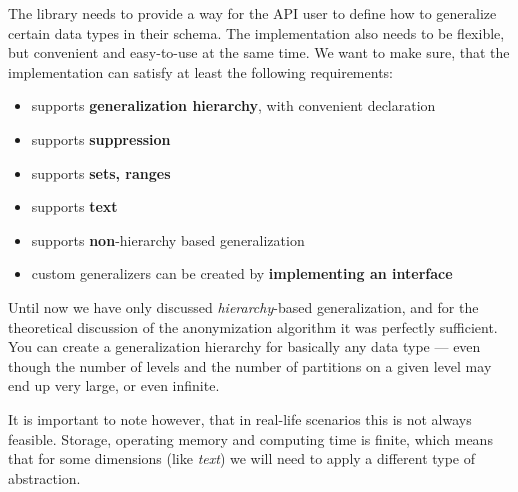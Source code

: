The library needs to provide a way for the API user to define how to generalize certain data types in their schema.
The implementation also needs to be flexible, but convenient and easy-to-use at the same time.
We want to make sure, that the implementation can satisfy at least the following requirements:

\begin{itemize}
    \item supports \textbf{generalization hierarchy}, with convenient declaration
    \item supports \textbf{suppression}
    \item supports \textbf{sets, ranges}
    \item supports \textbf{text}
    \item supports \textbf{non}-hierarchy based generalization
    \item custom generalizers can be created by \textbf{implementing an interface}
\end{itemize}

Until now we have only discussed \textit{hierarchy}-based generalization, and for the theoretical discussion of the anonymization algorithm it was perfectly sufficient.
You can create a generalization hierarchy for basically any data type --- even though the number of levels and the number of partitions on a given level may end up very large, or even infinite.

It is important to note however, that in real-life scenarios this is not always feasible.
Storage, operating memory and computing time is finite, which means that for some dimensions (like \textit{text}) we will need to apply a different type of abstraction.